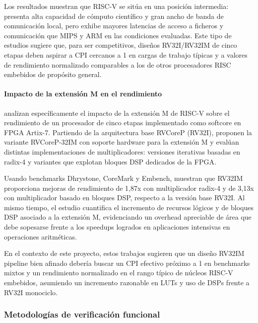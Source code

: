 Los resultados muestran que RISC-V se sitúa en una posición intermedia: presenta
alta capacidad de cómputo científico y gran ancho de banda de comunicación
local, pero exhibe mayores latencias de acceso a ficheros y comunicación que
MIPS y ARM en las condiciones evaluadas. Este tipo de estudios sugiere que, para
ser competitivos, diseños RV32I/RV32IM de cinco etapas deben aspirar a CPI
cercanos a 1 en cargas de trabajo típicas y a valores de rendimiento normalizado
comparables a los de otros procesadores RISC embebidos de propósito general.


\paragraph{Impacto de la extensión M en el rendimiento}

\textcite{Islam2020RVCoreP32IM} analizan específicamente el impacto de la
extensión M de RISC-V sobre el rendimiento de un procesador de cinco etapas
implementado como softcore en FPGA Artix-7. Partiendo de la arquitectura base
RVCoreP (RV32I), proponen la variante RVCoreP-32IM con soporte hardware para
la extensión M y evalúan distintas implementaciones de multiplicadores:
versiones iterativas basadas en radix-4 y variantes que explotan bloques DSP
dedicados de la FPGA.

Usando benchmarks Dhrystone, CoreMark y Embench, muestran que RV32IM
proporciona mejoras de rendimiento de 1{,}87x con multiplicador radix-4 y de
3{,}13x con multiplicador basado en bloques DSP, respecto a la versión base
RV32I. Al mismo tiempo, el estudio cuantifica el incremento de recursos lógicos
y de bloques DSP asociado a la extensión M, evidenciando un overhead apreciable
de área que debe sopesarse frente a los speedups logrados en aplicaciones
intensivas en operaciones aritméticas.\parencite{Islam2020RVCoreP32IM}

En el contexto de este proyecto, estos trabajos sugieren que un diseño RV32IM
pipeline bien afinado debería buscar un CPI efectivo próximo a 1 en benchmarks
mixtos y un rendimiento normalizado en el rango típico de núcleos RISC-V
embebidos, asumiendo un incremento razonable en LUTs y uso de DSPs frente a
RV32I monociclo.\parencite{Liu2021Performance,Islam2020RVCoreP32IM}


\subsubsection{Metodologías de verificación funcional}

